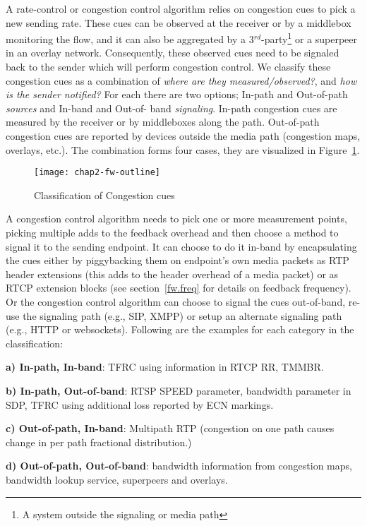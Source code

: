 A rate-control or congestion control algorithm relies on congestion cues to
pick a new sending rate. These cues can be observed at the receiver or by a
middlebox monitoring the flow, and it can also be aggregated by a
3$^{rd}$-party\footnote{A system outside the signaling or media path} or a
superpeer in an overlay network. Consequently, these observed cues need to be
signaled back to the sender which will perform congestion control. We classify
these congestion cues as a combination of \emph{where are they
measured/observed?}, and \emph{how is the sender notified?} For each there are
two options; In-path and Out-of-path \emph{sources} and In-band and Out-of-%
band \emph{signaling}. In-path congestion cues are measured by the receiver or
by middleboxes along the path. Out-of-path congestion cues are reported by
devices outside the media path (congestion maps, overlays, etc.). The
combination forms four cases, they are visualized in Figure~\ref{fig:4:fw}.


\begin{figure}[!h]
\texttt{[image: chap2-fw-outline]}
\caption{Classification of Congestion cues}
\label{fig:4:fw}
\end{figure}

A congestion control algorithm needs to pick one or more measurement points,
picking multiple adds to the feedback overhead and then choose a method to
signal it to the sending endpoint. It can choose to do it in-band by
encapsulating the cues either by piggybacking them on endpoint's own media
packets as RTP header extensions (this adds to the header overhead of a media
packet) or as RTCP extension blocks (see section~\ref{fw.freq} for details on
feedback frequency). Or the congestion control algorithm can choose to signal
the cues out-of-band, re-use the signaling path (e.g., SIP, XMPP) or setup an
alternate signaling path (e.g., HTTP or websockets). Following are the
examples for each category in the classification:

\textbf{a) In-path, In-band}: TFRC using information in RTCP RR, TMMBR.

\textbf{b) In-path, Out-of-band}: RTSP SPEED parameter, bandwidth parameter in
SDP, TFRC using additional loss reported by ECN markings.

\textbf{c) Out-of-path, In-band}: Multipath RTP (congestion on one path causes
change in per path fractional distribution.)

\textbf{d) Out-of-path, Out-of-band}: bandwidth information from congestion
maps, bandwidth lookup service, superpeers and overlays.

